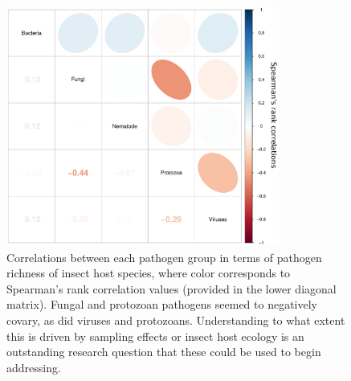 \documentclass[12pt]{article}
\begin{document}
\clearpage


\begin{figure}[h!]
  \begin{center}
    \includegraphics[width=0.8\textwidth]{Figures/corPlot.pdf}
    \caption{Correlations between each pathogen group in terms of pathogen richness of insect host species, where color corresponds to Spearman's rank correlation values (provided in the lower diagonal matrix). Fungal and protozoan pathogens seemed to negatively covary, as did viruses and protozoans. Understanding to what extent this is driven by sampling effects or insect host ecology is an outstanding research question that these could be used to begin addressing.}
    \label{fig:corPlot}
  \end{center}
\end{figure}
\end{document}
